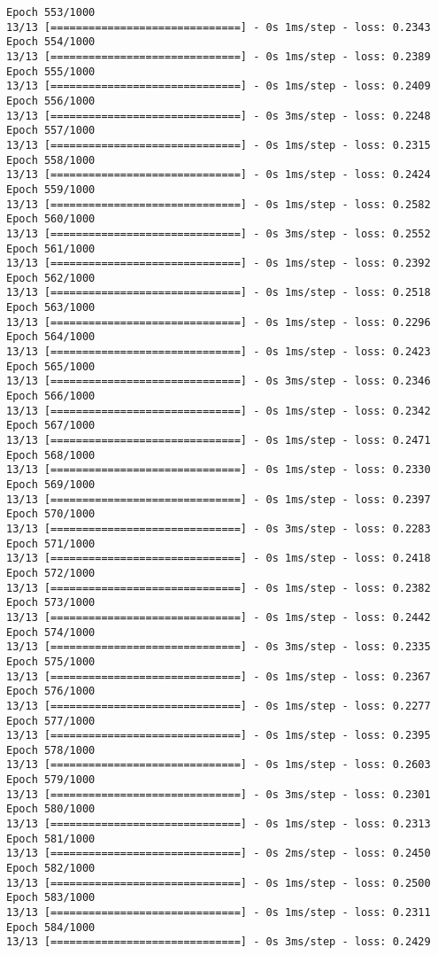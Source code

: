 \documentclass[11pt]{article}
\begin{document}
\begin{Verbatim}[commandchars=\\\{\}]
Epoch 553/1000
13/13 [==============================] - 0s 1ms/step - loss: 0.2343
Epoch 554/1000
13/13 [==============================] - 0s 1ms/step - loss: 0.2389
Epoch 555/1000
13/13 [==============================] - 0s 1ms/step - loss: 0.2409
Epoch 556/1000
13/13 [==============================] - 0s 3ms/step - loss: 0.2248
Epoch 557/1000
13/13 [==============================] - 0s 1ms/step - loss: 0.2315
Epoch 558/1000
13/13 [==============================] - 0s 1ms/step - loss: 0.2424
Epoch 559/1000
13/13 [==============================] - 0s 1ms/step - loss: 0.2582
Epoch 560/1000
13/13 [==============================] - 0s 3ms/step - loss: 0.2552
Epoch 561/1000
13/13 [==============================] - 0s 1ms/step - loss: 0.2392
Epoch 562/1000
13/13 [==============================] - 0s 1ms/step - loss: 0.2518
Epoch 563/1000
13/13 [==============================] - 0s 1ms/step - loss: 0.2296
Epoch 564/1000
13/13 [==============================] - 0s 1ms/step - loss: 0.2423
Epoch 565/1000
13/13 [==============================] - 0s 3ms/step - loss: 0.2346
Epoch 566/1000
13/13 [==============================] - 0s 1ms/step - loss: 0.2342
Epoch 567/1000
13/13 [==============================] - 0s 1ms/step - loss: 0.2471
Epoch 568/1000
13/13 [==============================] - 0s 1ms/step - loss: 0.2330
Epoch 569/1000
13/13 [==============================] - 0s 1ms/step - loss: 0.2397
Epoch 570/1000
13/13 [==============================] - 0s 3ms/step - loss: 0.2283
Epoch 571/1000
13/13 [==============================] - 0s 1ms/step - loss: 0.2418
Epoch 572/1000
13/13 [==============================] - 0s 1ms/step - loss: 0.2382
Epoch 573/1000
13/13 [==============================] - 0s 1ms/step - loss: 0.2442
Epoch 574/1000
13/13 [==============================] - 0s 3ms/step - loss: 0.2335
Epoch 575/1000
13/13 [==============================] - 0s 1ms/step - loss: 0.2367
Epoch 576/1000
13/13 [==============================] - 0s 1ms/step - loss: 0.2277
Epoch 577/1000
13/13 [==============================] - 0s 1ms/step - loss: 0.2395
Epoch 578/1000
13/13 [==============================] - 0s 1ms/step - loss: 0.2603
Epoch 579/1000
13/13 [==============================] - 0s 3ms/step - loss: 0.2301
Epoch 580/1000
13/13 [==============================] - 0s 1ms/step - loss: 0.2313
Epoch 581/1000
13/13 [==============================] - 0s 2ms/step - loss: 0.2450
Epoch 582/1000
13/13 [==============================] - 0s 1ms/step - loss: 0.2500
Epoch 583/1000
13/13 [==============================] - 0s 1ms/step - loss: 0.2311
Epoch 584/1000
13/13 [==============================] - 0s 3ms/step - loss: 0.2429

\end{Verbatim}
\end{document}
